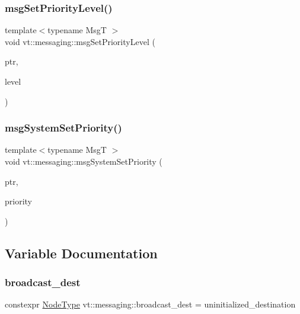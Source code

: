 \subsubsection{\texorpdfstring{msg\+Set\+Priority\+Level()}{msgSetPriorityLevel()}}
{\footnotesize\ttfamily template$<$typename MsgT $>$ \\
void vt\+::messaging\+::msg\+Set\+Priority\+Level (\begin{DoxyParamCaption}\item[{MsgT}]{ptr,  }\item[{\hyperlink{namespacevt_a53e07fdb3351b0f263e0dfd51b968d5e}{Priority\+Level\+Type}}]{level }\end{DoxyParamCaption})}

\mbox{\label{namespacevt_1_1messaging_ab609ea1ed68952c30bc8f9bba8d796b2}} 
\subsubsection{\texorpdfstring{msg\+System\+Set\+Priority()}{msgSystemSetPriority()}}
{\footnotesize\ttfamily template$<$typename MsgT $>$ \\
void vt\+::messaging\+::msg\+System\+Set\+Priority (\begin{DoxyParamCaption}\item[{MsgT}]{ptr,  }\item[{\hyperlink{namespacevt_a86bff9f556eb761b27fc8600d006ac04}{Priority\+Type}}]{priority }\end{DoxyParamCaption})}



\subsection{Variable Documentation}
\mbox{\label{namespacevt_1_1messaging_a11d2b356f56486f2e60f0255cb6b05ff}} 
\subsubsection{\texorpdfstring{broadcast\+\_\+dest}{broadcast\_dest}}
{\footnotesize\ttfamily constexpr \hyperlink{namespacevt_a866da9d0efc19c0a1ce79e9e492f47e2}{Node\+Type} vt\+::messaging\+::broadcast\+\_\+dest = uninitialized\+\_\+destination}

